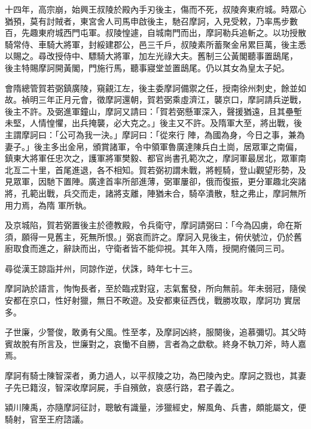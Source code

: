 \begin{pinyinscope}
 十四年，高宗崩，始興王叔陵於殿內手刃後主，傷而不死，叔陵奔東府城。時眾心猶預，莫有討賊者，東宮舍人司馬申啟後主，馳召摩訶，入見受敕，乃率馬步數百，先趣東府城西門屯軍。叔陵惶遽，自城南門而出，摩訶勒兵追斬之。以功授散騎常侍、車騎大將軍，封綏建郡公，邑三千戶，叔陵素所蓄聚金帛累巨萬，後主悉以賜之。尋改授侍中、驃騎大將軍，加左光祿大夫。舊制三公黃閣聽事置鴟尾，
 後主特賜摩訶開黃閣，門施行馬，聽事寢堂並置鴟尾。仍以其女為皇太子妃。



 會隋總管賀若弼鎮廣陵，窺覦江左，後主委摩訶備禦之任，授南徐州刺史，餘並如故。禎明三年正月元會，徵摩訶還朝，賀若弼乘虛濟江，襲京口，摩訶請兵逆戰，後主不許。及弼進軍鐘山，摩訶又請曰：「賀若弼懸軍深入，聲援猶遠，且其壘塹未堅，人情惶懼，出兵掩襲，必大克之。」後主又不許。及隋軍大至，將出戰，後主謂摩訶曰：「公可為我一決。」摩訶曰：「從來行
 陣，為國為身，今日之事，兼為妻子。」後主多出金帛，頒賞諸軍，令中領軍魯廣達陳兵白土崗，居眾軍之南偏，鎮東大將軍任忠次之，護軍將軍樊毅、都官尚書孔範次之，摩訶軍最居北，眾軍南北亙二十里，首尾進退，各不相知。賀若弼初謂未戰，將輕騎，登山觀望形勢，及見眾軍，因馳下置陣。廣達首率所部進薄，弼軍屢卻，俄而復振，更分軍趣北突諸將，孔範出戰，兵交而走，諸將支離，陣猶未合，騎卒潰散，駐之弗止，摩訶無所用力焉，為隋
 軍所執。



 及京城陷，賀若弼置後主於德教殿，令兵衛守，摩訶請弼曰：「今為囚虜，命在斯須，願得一見舊主，死無所恨。」弼哀而許之。摩訶入見後主，俯伏號泣，仍於舊廚取食而進之，辭訣而出，守衛者皆不能仰視。其年入隋，授開府儀同三司。



 尋從漢王諒詣并州，同諒作逆，伏誅，時年七十三。



 摩訶訥於語言，恂恂長者，至於臨戎對寇，志氣奮發，所向無前。年未弱冠，隨侯安都在京口，性好射獵，無日不畋遊。及安都東征西伐，戰勝攻取，摩訶功
 實居多。



 子世廉，少警俊，敢勇有父風。性至孝，及摩訶凶終，服闋後，追慕彌切。其父時賓故脫有所言及，世廉對之，哀慟不自勝，言者為之歔欷。終身不執刀斧，時人嘉焉。



 摩訶有騎士陳智深者，勇力過人，以平叔陵之功，為巴陵內史。摩訶之戮也，其妻子先已籍沒，智深收摩訶屍，手自殯斂，哀感行路，君子義之。



 潁川陳禹，亦隨摩訶征討，聰敏有識量，涉獵經史，解風角、兵書，頗能屬文，便騎射，官至王府諮議。




\end{pinyinscope}
